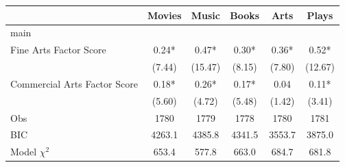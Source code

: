 {
\def\sym#1{\ifmmode^{#1}\else\(^{#1}\)\fi}
\begin{tabular*}{\hsize}{@{\hskip\tabcolsep\extracolsep\fill}l*{5}{c}}
\toprule
                    &\multicolumn{1}{c}{Movies}&\multicolumn{1}{c}{Music}&\multicolumn{1}{c}{Books}&\multicolumn{1}{c}{Arts}&\multicolumn{1}{c}{Plays}\\
\midrule
main                &             &             &             &             &             \\
Fine Arts Factor Score&        0.24*&        0.47*&        0.30*&        0.36*&        0.52*\\
                    &      (7.44) &     (15.47) &      (8.15) &      (7.80) &     (12.67) \\
Commercial Arts Factor Score&        0.18*&        0.26*&        0.17*&        0.04 &        0.11*\\
                    &      (5.60) &      (4.72) &      (5.48) &      (1.42) &      (3.41) \\
\midrule
Obs                 &        1780 &        1779 &        1778 &        1780 &        1781 \\
BIC                 &      4263.1 &      4385.8 &      4341.5 &      3553.7 &      3875.0 \\
Model $\chi^{2}$    &       653.4 &       577.8 &       663.0 &       684.7 &       681.8 \\
\bottomrule
\end{tabular*}
}
